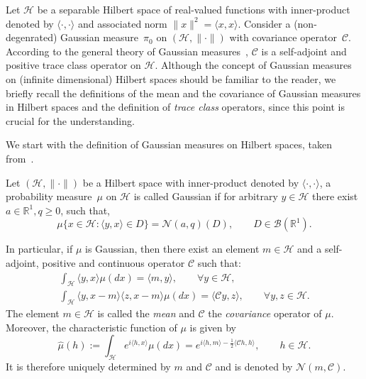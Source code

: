 Let $\mathcal{H}$ be a separable Hilbert space of real-valued functions with inner-product denoted by $\langle \cdot, \cdot \rangle$ and associated norm $\|x\|^2 = \langle x, x \rangle$. Consider a (non-degenrated) Gaussian measure~$\pi_0$ on $(\mathcal{H}, \|\cdot\|)$ with covariance operator~$\mathcal{C}$. According to the general theory of Gaussian measures~\autocite[Chapter I]{DaPrato1992}, $\mathcal{C}$ is a self-adjoint and positive trace class operator on $\mathcal{H}$. Although the concept of Gaussian measures on (infinite dimensional) Hilbert spaces should be familiar to the reader, we briefly recall the definitions of the mean and the covariance of Gaussian measures in Hilbert spaces and the definition of \textit{trace class} operators, since this point is crucial for the understanding.

We start with the definition of Gaussian measures on Hilbert spaces, taken from~\autocite[Section 2.3.2]{DaPrato1992}.

\begin{defin}
\label{DLR-Setting: Definition Gaussian measure}
 Let $(\mathcal{H}, \|\cdot\|)$ be a Hilbert space with inner-product denoted by $\langle \cdot, \cdot \rangle$, a probability measure~$\mu$ on $\mathcal{H}$ is called Gaussian if for arbitrary $y \in \mathcal{H}$ there exist $a \in \mathbb{R}^1, q \geq 0$, such that,
 \begin{equation*}
  \mu \{ x \in \mathcal{H}: \langle y, x \rangle \in D \} = \mathcal{N}(a, q) (D), \qquad D \in \mathcal{B}(\mathbb{R}^1).
 \end{equation*}
\end{defin}

 In particular, if $\mu$ is Gaussian, then there exist an element $m \in \mathcal{H}$ and a self-adjoint, positive and continuous operator $\mathcal{C}$ such that:
 \begin{align}
  \int_{\mathcal{H}} \langle y, x \rangle \mu (dx) = \langle m, y \rangle, \qquad \forall y \in \mathcal{H}, \\
  \int_{\mathcal{H}} \langle y, x - m \rangle \langle z, x - m \rangle \mu (dx) = \langle \mathcal{C}y, z \rangle, \qquad \forall y, z \in \mathcal{H}.
 \end{align}
The element $m \in \mathcal{H}$ is called the \textit{mean} and $\mathcal{C}$ the \textit{covariance} operator of $\mu$. Moreover, the characteristic function of $\mu$ is given by 
\begin{equation*}
 \widehat{\mu} (h) := \int_{\mathcal{H}} e^{i \langle h, x \rangle} \mu(dx) = e^{i \langle h, m \rangle - \tfrac{1}{2} \langle \mathcal{C} h, h \rangle}, \qquad h \in \mathcal{H}.
\end{equation*}
It is therefore uniquely determined by $m$ and $\mathcal{C}$ and is denoted by $ \mathcal{N}(m, \mathcal{C})$.

